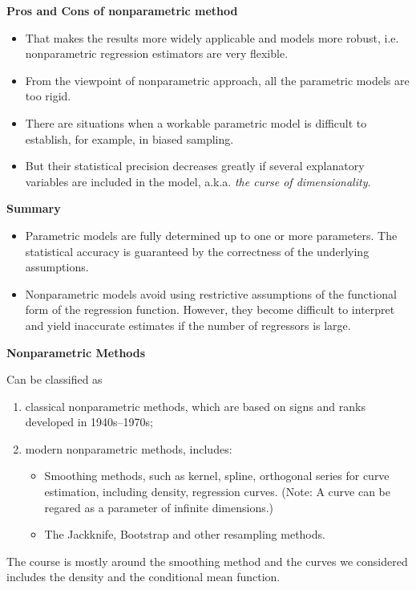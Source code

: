 \documentclass[19pt,landscaoe]{article}
\begin{document}
\newpage
{\LARGE\centerline{\textbf{Pros and Cons of nonparametric method}}}
\vskip25pt
\begin{minipage}{.9\textwidth}
    \Large
\begin{itemize}
\item That makes the results more widely applicable and models more robust, i.e. nonparametric regression estimators are very flexible.
\item From the viewpoint of nonparametric approach, all the parametric models are too rigid. 
\item There are situations when a workable parametric model is difficult to establish, for example, in biased sampling. 
\item But their statistical precision decreases greatly if several explanatory variables are included in the model, a.k.a. {\it the curse of dimensionality}.
\end{itemize}

\end{minipage}

\newpage
{\LARGE\centerline{\textbf{Summary}}}
\vskip25pt
\begin{minipage}{.9\textwidth}
    \Large
\begin{itemize}
\item Parametric models are fully determined up to one or more parameters. The statistical accuracy is guaranteed by the correctness of the underlying assumptions. 
\item Nonparametric models avoid using restrictive assumptions of the functional form of the regression function. However, they become difficult to interpret and yield inaccurate estimates if the number of regressors is large. 
\end{itemize}

\end{minipage}

\newpage
{\LARGE\centerline{\textbf{Nonparametric Methods}}}
\vskip25pt
\begin{minipage}{.9\textwidth}
    \Large Can be classified as 
\begin{enumerate}
\item classical nonparametric methods, which are based on signs and ranks developed in 1940s--1970s;
\item modern nonparametric methods, includes:
\begin{itemize}
    \item Smoothing methods, such as kernel, spline, orthogonal series for curve estimation, including density, regression curves. (Note: A curve can be regared as a parameter of infinite dimensions.)
    \item The Jackknife, Bootstrap and other resampling methods. 
\end{itemize}
\end{enumerate}
The course is mostly around the smoothing method and the curves we considered includes the density 
    and the conditional mean function.
\end{minipage}
\end{document}
